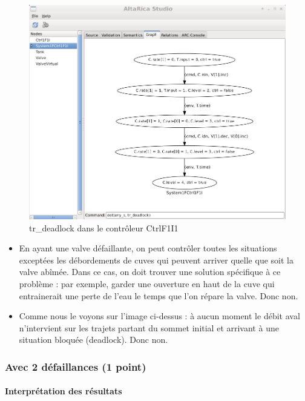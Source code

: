 \documentclass[a4paper]{book}
\begin{document}
\begin{figure}[H]
  \centering
  \includegraphics[width=14cm]{img/CtrlF1I1.png}
  \caption{tr\_deadlock dans le contrôleur CtrlF1I1}
\end{figure}

\begin{itemize}
	\item En ayant une valve défaillante, on peut contrôler toutes les situations exceptées les débordements de cuves qui peuvent arriver quelle que soit la valve abîmée. Dans ce cas, on doit trouver une solution spécifique à ce problème : par exemple, garder une ouverture en haut de la cuve qui entrainerait une perte de l'eau le temps que l'on répare la valve. Donc non.
	\item Comme nous le voyons sur l'image ci-dessus : à aucun moment le débit aval n'intervient sur les trajets partant du sommet initial et arrivant à une situation bloquée (deadlock). Donc non.
\end{itemize}

\subsubsection{Avec 2 défaillances (1 point)}





\paragraph{Interprétation des résultats}
\end{document}
